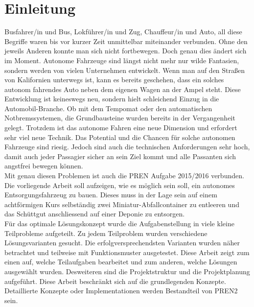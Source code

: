 \section{Einleitung}
Busfahrer/in und Bus, Lokführer/in und Zug, Chauffeur/in und Auto, all diese Begriffe waren bis vor kurzer Zeit unmittelbar miteinander verbunden. Ohne den jeweils Anderen konnte man sich nicht fortbewegen. Doch genau dies ändert sich im Moment. Autonome Fahrzeuge sind längst nicht mehr nur wilde Fantasien, sondern werden von vielen Unternehmen entwickelt. Wenn man auf den Straßen von Kalifornien unterwegs ist, kann es bereits geschehen, dass ein solches autonom fahrendes Auto neben dem eigenen Wagen an der Ampel steht. Diese Entwicklung ist keineswegs neu, sondern hielt schleichend Einzug in die Automobil-Branche. Ob mit dem Tempomat oder den automatischen Notbremssystemen, die Grundbausteine wurden bereits in der Vergangenheit gelegt.
Trotzdem ist das autonome Fahren eine neue Dimension und erfordert sehr viel neue Technik. Das Potential und die Chancen für solche autonomen Fahrzeuge sind riesig. Jedoch sind auch die technischen Anforderungen sehr hoch, damit auch jeder Passagier sicher an sein Ziel kommt und alle Passanten sich angstfrei bewegen können. \\
Mit genau diesen Problemen ist auch die PREN Aufgabe 2015/2016 verbunden. Die vorliegende Arbeit soll aufzeigen, wie es möglich sein soll, ein autonomes Entsorgungsfahrzeug zu bauen. Dieses muss in der Lage sein auf einem achtförmigen Kurs selbständig zwei Miniatur-Abfallcontainer zu entleeren und das Schüttgut anschliessend auf einer Deponie zu entsorgen.\\
Für das optimale Lösungskonzept wurde die Aufgabenstellung in viele kleine Teilprobleme aufgeteilt. Zu jedem Teilproblem wurden verschiedene Lösungsvarianten gesucht. Die erfolgversprechendsten Varianten wurden näher betrachtet und teilweise mit Funktionsmuster ausgetestet. Diese Arbeit zeigt zum einen auf, welche Teilaufgaben bearbeitet und zum anderen, welche Lösungen ausgewählt wurden. Desweiteren sind die Projektstruktur und die Projektplanung aufgeführt. Diese Arbeit beschränkt sich auf die grundlegenden Konzepte. Detaillierte Konzepte oder Implementationen werden Bestandteil von PREN2 sein. 

\newpage